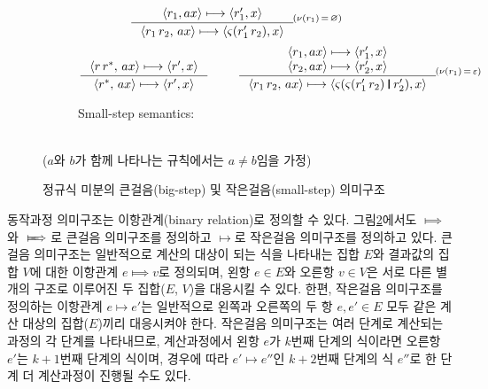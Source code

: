 \begin{figure}
\begin{subfigure}{\textwidth}
\[\quad
\inference{ \langle r_1, ax\rangle \longmapsto \langle r_1',x \rangle }{
            \langle r_1\,r_2,\, ax\rangle
            \longmapsto \langle\varsigma(r_1'\,r_2), x\rangle }
            \!^{(\nu(r_1)\,=\,\varnothing)}
\]
\[
\inference{
   \langle r\,r^{*},\, ax \rangle \longmapsto \langle r',x\rangle }{
   \langle r^{*},\, ax\rangle \longmapsto \langle r',x\rangle }
\qquad~
\inference{ \langle r_1, ax\rangle \longmapsto \langle r_1',x \rangle
         \\ \langle r_2, ax\rangle \longmapsto \langle r_2',x \rangle }{
            \langle r_1\,r_2,\, ax\rangle
            \longmapsto
            \langle\varsigma(\varsigma(r_1'\,r_2)\VERT r_2'),x\rangle }
            \!^{(\nu(r_1)\,=\,\varepsilon)}
\]
\caption{Small-step semantics:\label{sfig:ReDerivSmall}
 }
\end{subfigure}
~\\
{\small($a$와 $b$가 함께 나타나는 규칙에서는 $a\neq b$임을 가정)}
\caption{정규식 미분의 큰걸음(big-step) 및 작은걸음(small-step) 의미구조
         \label{fig:ReDerivBigSmallSem}}
\end{figure}

동작과정 의미구조는 이항관계(binary relation)로 정의할 수 있다.
그림\;\ref{fig:ReDerivBigSmallSem}에서도
$\Longmapsto$와 $\LONGmapsto$로 큰걸음 의미구조를 정의하고
$\longmapsto$로 작은걸음 의미구조를 정의하고 있다.
큰걸음 의미구조는 일반적으로 계산의 대상이 되는 식을 나타내는 집합
$E$와 결과값의 집합 $V$에 대한 이항관계 $e \Longmapsto v$로 정의되며,
왼항 $e\in E$와 오른항 $v\in V$은 서로 다른 별개의 구조로 이루어진
두 집합($E$, $V$)을 대응시킬 수 있다. 한편, 작은걸음 의미구조를
정의하는 이항관계 $e \longmapsto e'$는 일반적으로 왼쪽과 오른쪽의
두 항 $e,e'\in E$ 모두 같은 계산 대상의 집합($E$)끼리 대응시켜야 한다.
작은걸음 의미구조는 여러 단계로 계산되는 과정의 각 단계를 나타내므로,
계산과정에서 왼항 $e$가 $k$번째 단계의 식이라면
오른항 $e'$는 $k+1$번째 단계의 식이며, 경우에 따라
$e'\longmapsto e''$인 $k+2$번째 단계의 식 $e''$로
한 단계 더 계산과정이 진행될 수도 있다.


